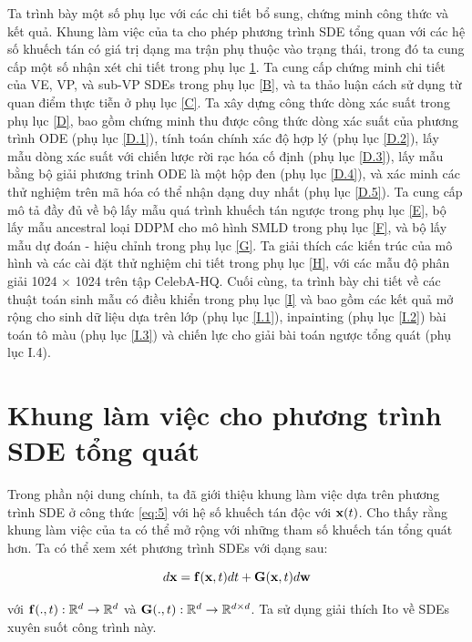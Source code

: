 \documentclass{article} %
\begin{document}
Ta trình bày một số phụ lục với các chi tiết bổ sung, chứng minh công thức và kết quả.
Khung làm việc của ta cho phép phương trình SDE tổng quan với các hệ số khuếch tán có giá trị dạng ma trận phụ thuộc vào trạng thái, trong đó ta cung cấp một số nhận xét chi tiết trong phụ lục \ref{A}.
Ta cung cấp chứng minh chi tiết của VE, VP, và sub-VP SDEs trong phụ lục \ref{B}, và ta thảo luận cách sử dụng từ quan điểm thực tiễn ở phụ lục \ref{C}.
Ta xây dựng công thức dòng xác suất trong phụ lục \ref{D}, bao gồm chứng minh thu được công thức dòng xác suất của phương trình ODE (phụ lục \ref{D.1}), tính toán chính xác độ hợp lý (phụ lục \ref{D.2}), lấy mẫu dòng xác suất với chiến lược rời rạc hóa cố định (phụ lục \ref{D.3}),
lấy mẫu bằng bộ giải phương trinh ODE là một hộp đen (phụ lục \ref{D.4}), và xác minh các thử nghiệm trên mã hóa có thể nhận dạng duy nhất (phụ lục \ref{D.5}).
Ta cung cấp mô tả đầy đủ về bộ lấy mẫu quá trình khuếch tán ngược trong phụ lục \ref{E},
bộ lấy mẫu ancestral loại DDPM cho mô hình SMLD trong phụ lục \ref{F}, và bộ lấy mẫu dự đoán - hiệu chỉnh trong phụ lục \ref{G}.
Ta giải thích các kiến trúc của mô hình và các cài đặt thử nghiệm chi tiết trong phụ lục \ref{H},
với các mẫu độ phân giải 1024 $\times$ 1024 trên tập CelebA-HQ.
Cuối cùng, ta trình bày chi tiết về các thuật toán sinh mẫu có điều khiển trong phụ lục \ref{I} và bao gồm các kết quả mở rộng cho sinh dữ liệu dựa trên lớp (phụ lục \ref{I.1}), inpainting (phụ lục \ref{I.2})
bài toán tô màu (phụ lục \ref{I.3}) và chiến lực cho giải bài toán ngược tổng quát (phụ lục I.4).

\section{Khung làm việc cho phương trình SDE tổng quát} \label{A}

Trong phần nội dung chính, ta đã giới thiệu khung làm việc dựa trên phương trình SDE ở công thức \ref{eq:5} với hệ số khuếch tán độc với $\bold{x}(t)$.
Cho thấy rằng khung làm việc của ta có thể mở rộng với những tham số khuếch tán tổng quát hơn.
Ta có thể xem xét phương trình SDEs với dạng sau:

\begin{equation} \label{eq:15}
    d \bold{x} = \bold{f} (\bold{x}, t) dt + \bold{G} (\bold{x}, t) d\bold{w}
\end{equation}

với $\bold{f}(., t): \mathbb{R}^d \rightarrow \mathbb{R}^d$ và $\bold{G}(., t): \mathbb{R}^d \rightarrow \mathbb{R}^{d \times d}$.
Ta sử dụng giải thích Ito về SDEs xuyên suốt công trình này.
\end{document}
